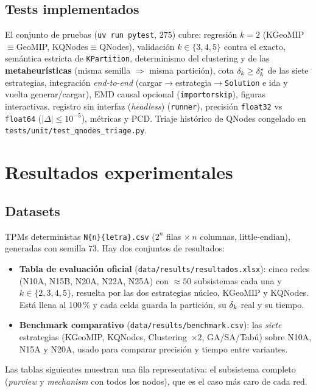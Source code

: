 \documentclass[11pt,letterpaper]{article}
\begin{document}
\subsection{Tests implementados}
El conjunto de pruebas (\texttt{uv run pytest}, $275$) cubre: regresión $k=2$
(KGeoMIP$\equiv$GeoMIP, KQNodes$\equiv$QNodes), validación $k\in\{3,4,5\}$ contra el
exacto, semántica estricta de \texttt{KPartition}, determinismo del clustering y de
las \textbf{metaheurísticas} (misma semilla $\Rightarrow$ misma partición), cota
$\delta_k\ge\delta_k^\star$ de las siete estrategias, integración \emph{end-to-end}
(cargar$\to$estrategia$\to$\texttt{Solution} e ida y vuelta generar/cargar),
EMD causal opcional (\texttt{importorskip}), figuras interactivas, registro sin
interfaz (\emph{headless})
(\texttt{runner}), precisión \texttt{float32} vs \texttt{float64}
($|\Delta|\le 10^{-5}$), métricas y PCD. Triaje histórico de QNodes congelado en
\texttt{tests/unit/test\_qnodes\_triage.py}.

\section{Resultados experimentales}
\label{sec:resultados}

\subsection{Datasets}
TPMs deterministas \texttt{N\{n\}\{letra\}.csv} ($2^n$ filas $\times\,n$ columnas,
little-endian), generadas con semilla $73$. Hay dos conjuntos de resultados:
\begin{itemize}
	\item \textbf{Tabla de evaluación oficial} (\texttt{data/results/resultados.xlsx}):
	      cinco redes (N10A, N15B, N20A, N22A, N25A) con $\approx 50$ subsistemas cada una y
	      $k\in\{2,3,4,5\}$, resuelta por las dos estrategias núcleo, KGeoMIP y KQNodes.
	      Está llena al 100\,\% y cada celda guarda la partición, su $\delta_k$ real y su tiempo.
	\item \textbf{Benchmark comparativo} (\texttt{data/results/benchmark.csv}):
	      las \emph{siete} estrategias (KGeoMIP, KQNodes, Clustering~$\times2$, GA/SA/Tabú)
	      sobre N10A, N15A y N20A, usado para comparar precisión y tiempo entre variantes.
\end{itemize}
Las tablas siguientes muestran una fila representativa: el subsistema completo
(\emph{purview} y \emph{mechanism} con todos los nodos), que es el caso más caro de
cada red.
\end{document}
